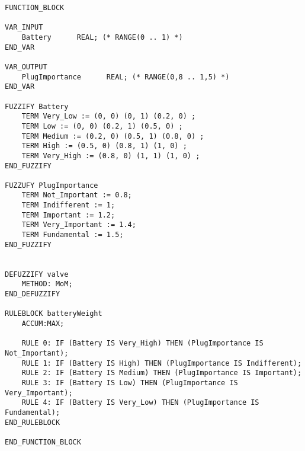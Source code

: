 \begin{verbatim}
FUNCTION_BLOCK

VAR_INPUT
    Battery      REAL; (* RANGE(0 .. 1) *) 
END_VAR

VAR_OUTPUT
    PlugImportance      REAL; (* RANGE(0,8 .. 1,5) *) 
END_VAR

FUZZIFY Battery
    TERM Very_Low := (0, 0) (0, 1) (0.2, 0) ;
    TERM Low := (0, 0) (0.2, 1) (0.5, 0) ;
    TERM Medium := (0.2, 0) (0.5, 1) (0.8, 0) ;
    TERM High := (0.5, 0) (0.8, 1) (1, 0) ;
    TERM Very_High := (0.8, 0) (1, 1) (1, 0) ;
END_FUZZIFY

FUZZUFY PlugImportance
    TERM Not_Important := 0.8;
    TERM Indifferent := 1;
    TERM Important := 1.2;
    TERM Very_Important := 1.4;
    TERM Fundamental := 1.5;
END_FUZZIFY


DEFUZZIFY valve 
    METHOD: MoM;
END_DEFUZZIFY

RULEBLOCK batteryWeight
    ACCUM:MAX;

    RULE 0: IF (Battery IS Very_High) THEN (PlugImportance IS Not_Important);
    RULE 1: IF (Battery IS High) THEN (PlugImportance IS Indifferent);
    RULE 2: IF (Battery IS Medium) THEN (PlugImportance IS Important);
    RULE 3: IF (Battery IS Low) THEN (PlugImportance IS Very_Important);
    RULE 4: IF (Battery IS Very_Low) THEN (PlugImportance IS Fundamental);
END_RULEBLOCK

END_FUNCTION_BLOCK
\end{verbatim}